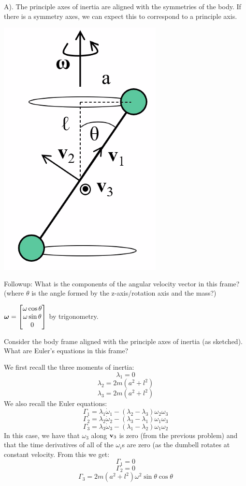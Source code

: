 \begin{s}
A). The principle axes of inertia are aligned with the symmetries of the body. If there is a symmetry axes, we can expect this to correspond to a principle axis.
\end{s}
\begin{center}
    \includegraphics[scale=0.5]{Lecture-20/l20-img3.png}
\end{center}
Followup: What is the components of the angular velocity vector in this frame? (where $\theta$ is the angle formed by the z-axis/rotation axis and the mass?)
\begin{s}
$\bm{\omega} = \begin{bmatrix}\omega\cos\theta \\ \omega\sin\theta \\ 0\end{bmatrix}$ by trigonometry. 
\end{s}
Consider the body frame aligned with the principle axes of inertia (as sketched). What are Euler's equations in this frame?
\begin{s}
We first recall the three moments of inertia:
\[\lambda_1 = 0\]
\[\lambda_2 = 2m(a^2 + l^2)\]
\[\lambda_3 = 2m(a^2 + l^2)\]
We also recall the Euler equations:
\[\Gamma_1 = \lambda_1\dot{\omega}_1 - (\lambda_2 - \lambda_3)\omega_2\omega_3\]
\[\Gamma_2 = \lambda_2\dot{\omega}_2 - (\lambda_3 - \lambda_1)\omega_1\omega_3\]
\[\Gamma_3 = \lambda_3\dot{\omega}_3 - (\lambda_1 - \lambda_2)\omega_1\omega_2\]
In this case, we have that $\omega_3$ along $\mathbf{v}_3$ is zero (from the previous problem) and that the time derivatives of all of the $\omega_i$s are zero (as the dumbell rotates at constant velocity. From this we get:
\[\Gamma_1 = 0\]
\[\Gamma_2 = 0\]
\[\Gamma_3 = 2m(a^2 + l^2)\omega^2\sin\theta\cos\theta\]
\end{s}
